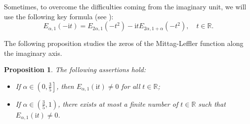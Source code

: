 \documentclass[reqno]{amsart}
\newtheorem{prop}[theorem]{Proposition}
\numberwithin{equation}{section}
\begin{document}
Sometimes, to overcome the difficulties coming from the imaginary unit, we will use the following key formula (see \cite{BS05}):
\begin{equation}\label{kf}
E_{\alpha,1}(-\mathrm{i} t)=E_{2 \alpha,1}\left(-t^2\right)-\mathrm{i} t E_{2 \alpha, 1+\alpha}\left(-t^2\right), \quad t\in \mathbb{R}.
\end{equation}

The following proposition studies the zeros of the Mittag-Leffler function along the imaginary axis.
\begin{prop}\label{zeros}
The following assertions hold:
\begin{itemize}
    \item[(i)] If $\alpha\in\left(0,\frac{3}{5}\right]$, then $E_{\alpha,1}(\mathrm{i} t)\neq 0$ for all $t\in\mathbb{R}$;
    \item[(ii)] If $\alpha\in \left(\frac{3}{5}, 1\right)$, there exists at most a finite number of $t\in \mathbb{R}$ such that $E_{\alpha,1}(\mathrm{i} t) \ne 0$.
\end{itemize}
\end{prop}
\end{document}
